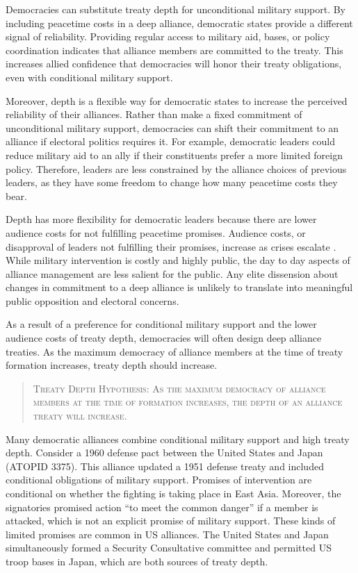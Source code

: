 \documentclass[12pt]{article}
\begin{document}
Democracies can substitute treaty depth for unconditional military support. 
By including peacetime costs in a deep alliance, democratic states provide a different signal of reliability. 
Providing regular access to military aid, bases, or policy coordination indicates that alliance members are committed to the treaty. 
This increases allied confidence that democracies will honor their treaty obligations, even with conditional military support. 


Moreover, depth is a flexible way for democratic states to increase the perceived reliability of their alliances. 
Rather than make a fixed commitment of unconditional military support, democracies can shift their commitment to an alliance if electoral politics requires it.
For example, democratic leaders could reduce military aid to an ally if their constituents prefer a more limited foreign policy.  
Therefore, leaders are less constrained by the alliance choices of previous leaders, as they have some freedom to change how many peacetime costs they bear. 


Depth has more flexibility for democratic leaders because there are lower audience costs for not fulfilling peacetime promises. 
Audience costs, or disapproval of leaders not fulfilling their promises, increase as crises escalate \citep{Tomz2007}. 
While military intervention is costly and highly public, the day to day aspects of alliance management are less salient for the public. 
Any elite dissension about changes in commitment to a deep alliance is unlikely to translate into meaningful public opposition and electoral concerns. 


As a result of a preference for conditional military support and the lower audience costs of treaty depth, democracies will often design deep alliance treaties. 
As the maximum democracy of alliance members at the time of treaty formation increases, treaty depth should increase. 


\begin{quote}
\textsc{Treaty Depth Hypothesis: As the maximum democracy of alliance members at the time of formation increases, the depth of an alliance treaty will increase.}
\end{quote} 


Many democratic alliances combine conditional military support and high treaty depth. 
Consider a 1960 defense pact between the United States and Japan (ATOPID 3375).
This alliance updated a 1951 defense treaty and included conditional obligations of military support. 
Promises of intervention are conditional on whether the fighting is taking place in East Asia. 
Moreover, the signatories promised action ``to meet the common danger'' if a member is attacked, which is not an explicit promise of military support. 
These kinds of limited promises are common in US alliances. 
The United States and Japan simultaneously formed a Security Consultative committee and permitted US troop bases in Japan, which are both sources of treaty depth. 
\end{document}
